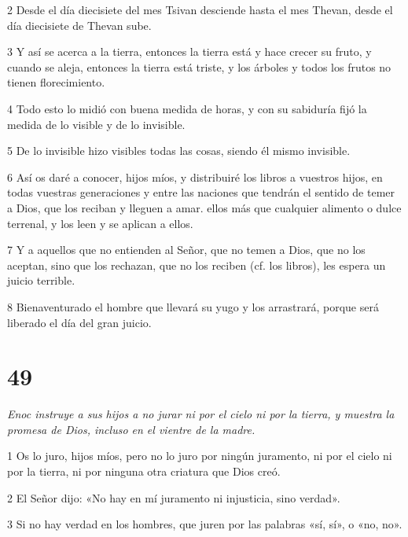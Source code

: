 \par 2 Desde el día diecisiete del mes Tsivan desciende hasta el mes Thevan, desde el día diecisiete de Thevan sube.

\par 3 Y así se acerca a la tierra, entonces la tierra está y hace crecer su fruto, y cuando se aleja, entonces la tierra está triste, y los árboles y todos los frutos no tienen florecimiento.

\par 4 Todo esto lo midió con buena medida de horas, y con su sabiduría fijó la medida de lo visible y de lo invisible.

\par 5 De lo invisible hizo visibles todas las cosas, siendo él mismo invisible.

\par 6 Así os daré a conocer, hijos míos, y distribuiré los libros a vuestros hijos, en todas vuestras generaciones y entre las naciones que tendrán el sentido de temer a Dios, que los reciban y lleguen a amar. ellos más que cualquier alimento o dulce terrenal, y los leen y se aplican a ellos.

\par 7 Y a aquellos que no entienden al Señor, que no temen a Dios, que no los aceptan, sino que los rechazan, que no los reciben (cf. los libros), les espera un juicio terrible.

\par 8 Bienaventurado el hombre que llevará su yugo y los arrastrará, porque será liberado el día del gran juicio.

\chapter{49}

\par \textit{Enoc instruye a sus hijos a no jurar ni por el cielo ni por la tierra, y muestra la promesa de Dios, incluso en el vientre de la madre.}

\par 1 Os lo juro, hijos míos, pero no lo juro por ningún juramento, ni por el cielo ni por la tierra, ni por ninguna otra criatura que Dios creó.

\par 2 El Señor dijo: «No hay en mí juramento ni injusticia, sino verdad».

\par 3 Si no hay verdad en los hombres, que juren por las palabras «sí, sí», o «no, no».

